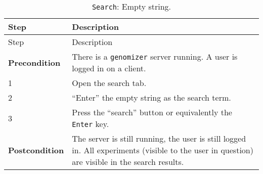 \begin{longtable}[c]{@{}ll@{}}
\caption{\texttt{Search}: Empty string.}\tabularnewline
\toprule
\begin{minipage}[b]{0.31\columnwidth}\raggedright\strut
Step
\strut\end{minipage} &
\begin{minipage}[b]{0.63\columnwidth}\raggedright\strut
Description
\strut\end{minipage}\tabularnewline
\midrule
\endfirsthead
\toprule
\begin{minipage}[b]{0.31\columnwidth}\raggedright\strut
Step
\strut\end{minipage} &
\begin{minipage}[b]{0.63\columnwidth}\raggedright\strut
Description
\strut\end{minipage}\tabularnewline
\midrule
\endhead
\begin{minipage}[t]{0.31\columnwidth}\raggedright\strut
\textbf{Precondition}
\strut\end{minipage} &
\begin{minipage}[t]{0.63\columnwidth}\raggedright\strut
There is a \texttt{genomizer} server running. A user is logged in on a
client.
\strut\end{minipage}\tabularnewline
\begin{minipage}[t]{0.31\columnwidth}\raggedright\strut
1
\strut\end{minipage} &
\begin{minipage}[t]{0.63\columnwidth}\raggedright\strut
Open the search tab.
\strut\end{minipage}\tabularnewline
\begin{minipage}[t]{0.31\columnwidth}\raggedright\strut
2
\strut\end{minipage} &
\begin{minipage}[t]{0.63\columnwidth}\raggedright\strut
``Enter'' the empty string as the search term.
\strut\end{minipage}\tabularnewline
\begin{minipage}[t]{0.31\columnwidth}\raggedright\strut
3
\strut\end{minipage} &
\begin{minipage}[t]{0.63\columnwidth}\raggedright\strut
Press the ``search'' button or equivalently the \texttt{Enter} key.
\strut\end{minipage}\tabularnewline
\begin{minipage}[t]{0.31\columnwidth}\raggedright\strut
\textbf{Postcondition}
\strut\end{minipage} &
\begin{minipage}[t]{0.63\columnwidth}\raggedright\strut
The server is still running, the user is still logged in. All
experiments (visible to the user in question) are visible in the search
results.
\strut\end{minipage}\tabularnewline
\bottomrule
\end{longtable}

